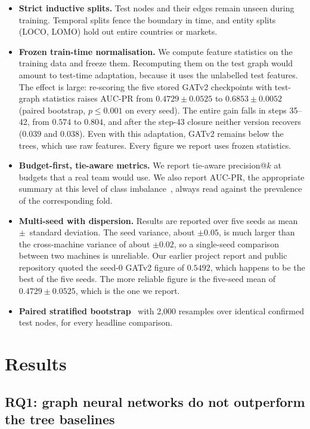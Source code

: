 \documentclass[conference]{IEEEtran}
\begin{document}
\begin{itemize}
\item \textbf{Strict inductive splits.} Test nodes and their edges remain
unseen during training. Temporal splits fence the boundary in time, and entity
splits (LOCO, LOMO) hold out entire countries or markets.
\item \textbf{Frozen train-time normalisation.} We compute feature statistics
on the training data and freeze them. Recomputing them on the test graph would
amount to test-time adaptation, because it uses the unlabelled test features.
The effect is large: re-scoring the five stored GATv2 checkpoints with
test-graph statistics raises AUC-PR from $0.4729 \pm 0.0525$ to
$0.6853 \pm 0.0052$ (paired bootstrap, $p \leq 0.001$ on every seed). The entire
gain falls in steps 35--42, from $0.574$ to $0.804$, and after the step-43
closure neither version recovers ($0.039$ and $0.038$). Even with this
adaptation, GATv2 remains below the trees, which use raw features. Every figure
we report uses frozen statistics.
\item \textbf{Budget-first, tie-aware metrics.} We report tie-aware
precision@$k$ at budgets that a real team would use. We also report AUC-PR, the
appropriate summary at this level of class imbalance~\cite{saito2015}, always
read against the prevalence of the corresponding fold.
\item \textbf{Multi-seed with dispersion.} Results are reported over five seeds
as mean~$\pm$~standard deviation. The seed variance, about $\pm 0.05$, is much
larger than the cross-machine variance of about $\pm 0.02$, so a single-seed
comparison between two machines is unreliable. Our earlier project report and
public repository quoted the seed-0 GATv2 figure of $0.5492$, which happens to
be the best of the five seeds. The more reliable figure is the five-seed mean
of $0.4729 \pm 0.0525$, which is the one we report.
\item \textbf{Paired stratified bootstrap}~\cite{efron1993} with 2,000
resamples over identical confirmed test nodes, for every headline
comparison.
\end{itemize}

\section{Results}

\subsection{RQ1: graph neural networks do not outperform the tree baselines}
\label{sec:rq1}
\end{document}

